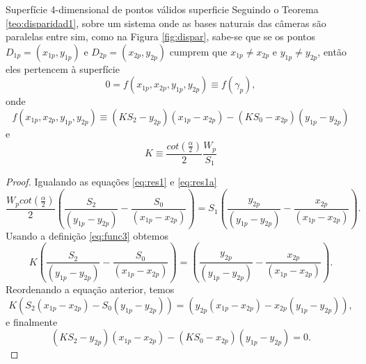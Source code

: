 \documentclass[a4paper,10pt]{article}
\begin{document}
\begin{corollarytcolorbox}{Superfície 4-dimensional de pontos válidos }{superficie}
 Seguindo o Teorema \ref{teo:disparidad1}, sobre um sistema onde as bases naturais das câmeras
 são paralelas entre sim, como na Figura \ref{fig:dispar}, sabe-se que se os pontos $D_{1p}=(x_{1p},y_{1p})$ e
 $D_{2p}=(x_{2p},y_{2p})$ cumprem que $x_{1p}\neq x_{2p}$ e $y_{1p}\neq y_{2p}$, então eles pertencem à superfície
 \begin{equation}\label{eq:func1}
 0=f(x_{1p},x_{2p},y_{1p},y_{2p})\equiv f(\gamma_p),
 \end{equation}
onde
 \begin{equation}\label{eq:func2}
  f(x_{1p},x_{2p},y_{1p},y_{2p}) \equiv (KS_2-y_{2p})(x_{1p}-x_{2p})-(KS_0-x_{2p})(y_{1p}-y_{2p})
 \end{equation}
 e
 \begin{equation}\label{eq:func3}
  K \equiv \frac{cot(\frac{\alpha}{2})}{2}\frac{W_p}{S_1}
 \end{equation} 
\end{corollarytcolorbox}
\begin{proof}
 Igualando as equações \eqref{eq:res1} e \eqref{eq:res1a}
 \begin{equation}\label{eq:func4}
 \frac{W_p cot(\frac{\alpha}{2})}{2} \left (\frac{ S_2}{(y_{1p}-y_{2p})} - \frac{ S_0}{(x_{1p}-x_{2p})}\right ) = S_1 \left (\frac{y_{2p} }{(y_{1p}-y_{2p})} - \frac{x_{2p} }{(x_{1p}-x_{2p})} \right ).
\end{equation}
Usando a definição \eqref{eq:func3} obtemos
 \begin{equation}\label{eq:func4a}
 K \left (\frac{ S_2}{(y_{1p}-y_{2p})} - \frac{ S_0}{(x_{1p}-x_{2p})}\right ) =  \left (\frac{y_{2p} }{(y_{1p}-y_{2p})} - \frac{x_{2p} }{(x_{1p}-x_{2p})} \right ).
\end{equation}
Reordenando a equação anterior, temos
\begin{equation}\label{eq:func5}
 K \left ({ S_2}{(x_{1p}-x_{2p})} - { S_0}{(y_{1p}-y_{2p})}\right ) =  \left ({y_{2p} }{(x_{1p}-x_{2p})} - {x_{2p} }{(y_{1p}-y_{2p})} \right ),
\end{equation}
e finalmente
\begin{equation}\label{eq:func6}
 (K { S_2}-y_{2p}){(x_{1p}-x_{2p})} - (K{ S_0}-x_{2p}){(y_{1p}-y_{2p})} =   0.
\end{equation}
\end{proof}
\end{document}
